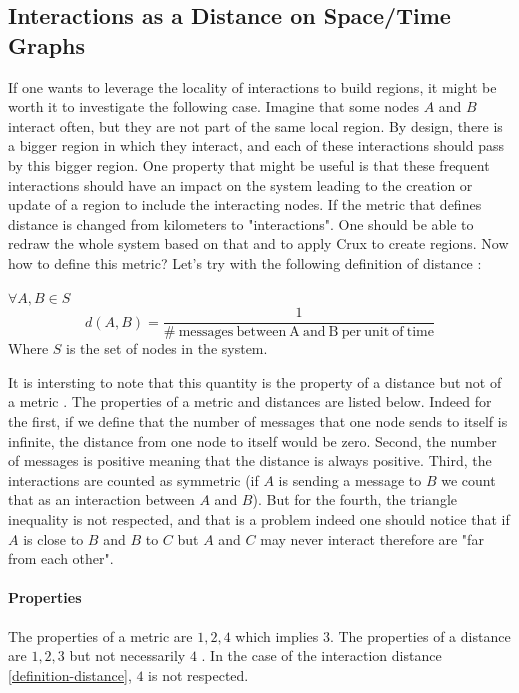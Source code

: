 \documentclass[a4paper,11pt,twoside=semi,openright]{report}
\begin{document}
\subsection{Interactions as a Distance on Space/Time Graphs}

If one wants to leverage the locality of interactions to build regions, it
might be worth it to investigate the following case. Imagine that some nodes
$A$ and $B$ interact often, but they are not part of the same local
region. By design, there is a bigger region in which they interact, and each of
these interactions should pass by this bigger region. One property that might
be useful is that these frequent interactions should have an impact on the
system leading to the creation or update of a region to include the interacting nodes. If the
metric that defines distance is changed from kilometers to "interactions". One
should be able to redraw the whole system based on that and to apply Crux to
create regions. Now how to define this metric? Let's try with the
following definition of distance :


$\forall A, B \in S$
\begin{equation} \label{definition-distance}
 d(A,B) = \frac{1}{ \mathrm{\#\ messages\ between\ A\ and\ B\ per\ unit\ of\ time} } 
\end{equation}
Where $S$ is the set of nodes in the system.

It is intersting to note that this quantity is the property of a distance but not of a metric
\cite{Greenhoe2016}. The properties of a metric and distances are listed below.
Indeed for the first, if we define that the number of messages that one node
sends to itself is infinite, the distance from one node to itself would be
zero. Second, the number of messages is positive meaning that the distance is always positive. Third, the interactions are counted as symmetric (if $A$ is
sending a message to $B$ we count that as an interaction between $A$ and $B$).
But for the fourth, the triangle inequality is not respected, and that is a
problem indeed one should notice that if $A$ is close to $B$ and $B$ to $C$ but
$A$ and $C$ may never interact therefore are "far from each other".  

\paragraph{Properties} The properties of a metric are $1, 2, 4$ which implies
$3$. The properties of a distance are $1,2,3$ but not necessarily $4$
\cite{Greenhoe2016}. In the case of the interaction distance
\autoref{definition-distance}, $4$ is not respected.
\end{document}
